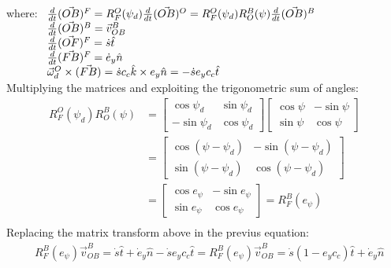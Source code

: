 \documentclass[12pt]{article}
\begin{document}
            where:  $ \begin{array}[t]{l}
                        \frac{d}{dt}(\vec{OB})^F = R^O_F(\psi_d) \frac{d}{dt}(\vec{OB})^O = R^O_F(\psi_d) R^B_O(\psi) \frac{d}{dt}(\vec{OB})^B \\
                        \frac{d}{dt}(\vec{OB})^B = \vec{v}_{OB}^B \\
                        \frac{d}{dt}(\vec{OF})^F = \dot{s} \hat{t} \\
                        \frac{d}{dt}(\vec{FB})^F = \dot{e}_y \hat{n} \\
                        \vec{\omega}_d^O \times (\vec{FB}) = \dot{s} c_c \hat{k} \times e_y \hat{n} = - \dot{s} e_y c_c \hat{t} \\
                    \end{array} $ \\
            Multiplying the matrices and exploiting the trigonometric sum of angles:
            \begin{equation}
                \begin{aligned}
                    R^O_F(\psi_d) R^B_O(\psi) & =
                    \begin{bmatrix} \cos{\psi_d} & \sin{\psi_d} \\ -\sin{\psi_d} & \cos{\psi_d} \end{bmatrix} 
                    \begin{bmatrix} \cos{\psi} & -\sin{\psi} \\ \sin{\psi} & \cos{\psi} \end{bmatrix}  \\
                    & = \begin{bmatrix} \cos{(\psi-\psi_d)} & -\sin{(\psi-\psi_d)} \\ \sin{(\psi-\psi_d)} & \cos{(\psi-\psi_d)} \end{bmatrix} \\
                    & = \begin{bmatrix} \cos{e_{\psi}} & -\sin{e_{\psi}} \\ \sin{e_{\psi}} & \cos{e_{\psi}} \end{bmatrix} = R^B_F(e_{\psi}) \\
                \end{aligned}
            \end{equation}
            Replacing the matrix transform above in the previus equation:
            \begin{equation}
                \begin{aligned}
                    & R^B_F(e_{\psi}) \vec{v}_{OB}^B = \dot{s} \hat{t} + \dot{e}_y \hat{n} - \dot{s} e_y c_c \hat{t}
                    = R^B_F(e_{\psi}) \vec{v}_{OB}^B = \dot{s} (1 - e_y c_c) \hat{t} + \dot{e}_y \hat{n} \\
                \end{aligned}
            \end{equation}
\end{document}
